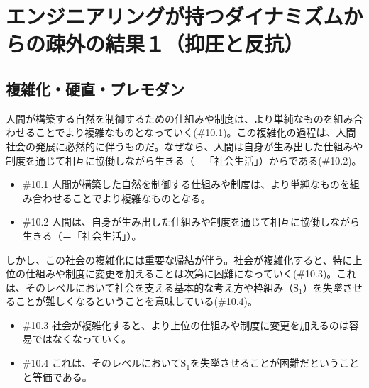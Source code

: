 \section{エンジニアリングが持つダイナミズムからの疎外の結果１（抑圧と反抗）}\label{ux30a8ux30f3ux30b8ux30cbux30a2ux30eaux30f3ux30b0ux304cux6301ux3064ux30c0ux30a4ux30caux30dfux30baux30e0ux304bux3089ux306eux758eux5916ux306eux7d50ux679cuxff11ux6291ux5727ux3068ux53cdux6297}

\subsection{複雑化・硬直・プレモダン}\label{ux8907ux96d1ux5316ux786cux76f4ux30d7ux30ecux30e2ux30c0ux30f3}

人間が構築する自然を制御するための仕組みや制度は、より単純なものを組み合わせることでより複雑なものとなっていく(\#10.1)。この複雑化の過程は、人間社会の発展に必然的に伴うものだ。なぜなら、人間は自身が生み出した仕組みや制度を通じて相互に協働しながら生きる（＝「社会生活」）からである(\#10.2)。

\begin{note}{}
  \begin{itemize}
    \tightlist
    \item{\#10.1}
      人間が構築した自然を制御する仕組みや制度は、より単純なものを組み合わせることでより複雑なものとなる。
    \item{\#10.2}
      人間は、自身が生み出した仕組みや制度を通じて相互に協働しながら生きる（＝「社会生活」）。
  \end{itemize}
\end{note}

しかし、この社会の複雑化には重要な帰結が伴う。社会が複雑化すると、特に上位の仕組みや制度に変更を加えることは次第に困難になっていく(\#10.3)。これは、そのレベルにおいて社会を支える基本的な考え方や枠組み（\(\textrm{S}_1\)）を失墜させることが難しくなるということを意味している(\#10.4)。

\begin{note}{}
  \begin{itemize}
    \tightlist
    \item{\#10.3}
      社会が複雑化すると、より上位の仕組みや制度に変更を加えるのは容易ではなくなっていく。
    \item{\#10.4}
      これは、そのレベルにおいて$\textrm{S}_1$を失墜させることが困難だということと等価である。
  \end{itemize}
\end{note}

